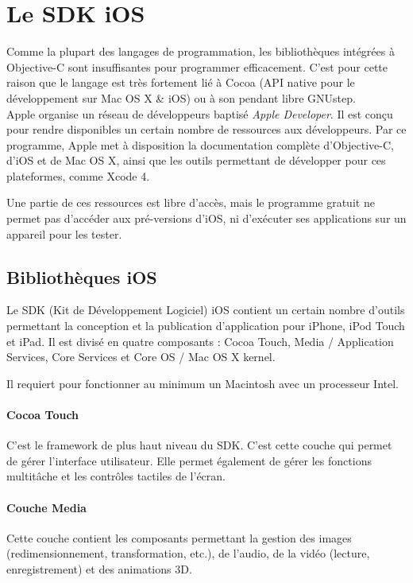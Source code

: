 \documentclass[11pt, french]{report}
\begin{document}
\section{Le SDK iOS}

Comme la plupart des langages de programmation, les bibliothèques intégrées à Objective-C sont insuffisantes pour programmer efficacement. C'est pour cette raison que le langage est très fortement lié à Cocoa (API native pour le développement sur Mac OS X \& iOS) ou à son pendant libre GNUstep.\\

Apple organise un réseau de développeurs baptisé \textit{Apple Developer}. Il est conçu pour rendre disponibles un certain nombre de ressources aux développeurs. Par ce programme, Apple met à disposition la documentation complète d'Objective-C, d'iOS et de Mac OS X, ainsi que les outils permettant de développer pour ces plateformes, comme Xcode 4.

Une partie de ces ressources est libre d'accès, mais le programme gratuit ne permet pas d'accéder aux pré-versions d'iOS, ni d'exécuter ses applications sur un appareil pour les tester.

\subsection{Bibliothèques iOS}

Le SDK (Kit de Développement Logiciel) iOS contient un certain nombre d'outils permettant la conception et la publication d'application pour iPhone, iPod Touch et iPad. Il est divisé en quatre composants : Cocoa Touch, Media / Application Services, Core Services et Core OS / Mac OS X kernel.

Il requiert pour fonctionner au minimum un Macintosh avec un processeur Intel.

\paragraph{Cocoa Touch} C'est le framework de plus haut niveau du SDK. C'est cette couche qui permet de gérer l'interface utilisateur. Elle permet également de gérer les fonctions multitâche et les contrôles tactiles de l'écran.

\paragraph{Couche Media} Cette couche contient les composants permettant la gestion des images (redimensionnement, transformation, etc.), de l'audio, de la vidéo (lecture, enregistrement) et des animations 3D.
\end{document}
